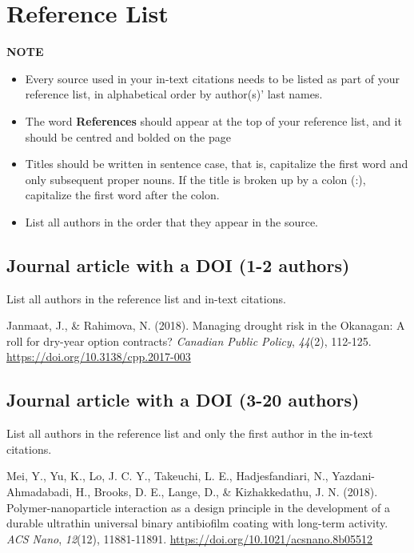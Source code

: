 \documentclass[
]{book}
\providecommand{\tightlist}{%
  \setlength{\itemsep}{0pt}\setlength{\parskip}{0pt}}
\begin{document}
\hypertarget{reference-list-1}{%
\section{Reference List}\label{reference-list-1}}

\textbf{NOTE}

\begin{itemize}
\tightlist
\item
  Every source used in your in-text citations needs to be listed as part of your reference list, in alphabetical order by author(s)' last names.
\item
  The word \textbf{References} should appear at the top of your reference list, and it should be centred and bolded on the page
\item
  Titles should be written in sentence case, that is, capitalize the first word and only subsequent proper nouns. If the title is broken up by a colon (:), capitalize the first word after the colon.
\item
  List all authors in the order that they appear in the source.
\end{itemize}

\hypertarget{journal-article-with-a-doi-1-2-authors-1}{%
\subsection*{Journal article with a DOI (1-2 authors)}\label{journal-article-with-a-doi-1-2-authors-1}}

List all authors in the reference list and in-text citations.

Janmaat, J., \& Rahimova, N. (2018). Managing drought risk in the Okanagan: A roll for dry-year option contracts? \emph{Canadian Public Policy}, \emph{44}(2), 112-125. \url{https://doi.org/10.3138/cpp.2017-003}

\hypertarget{journal-article-with-a-doi-3-20-authors-1}{%
\subsection*{Journal article with a DOI (3-20 authors)}\label{journal-article-with-a-doi-3-20-authors-1}}

List all authors in the reference list and only the first author in the in-text citations.

Mei, Y., Yu, K., Lo, J. C. Y., Takeuchi, L. E., Hadjesfandiari, N., Yazdani-Ahmadabadi, H., Brooks, D. E., Lange, D., \& Kizhakkedathu, J. N. (2018). Polymer-nanoparticle interaction as a design principle in the development of a durable ultrathin universal binary antibiofilm coating with long-term activity. \emph{ACS Nano}, \emph{12}(12), 11881-11891. \url{https://doi.org/10.1021/acsnano.8b05512}
\end{document}
